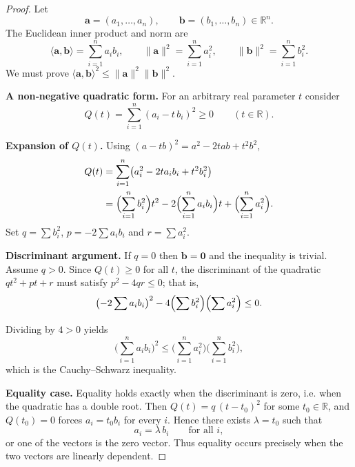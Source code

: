 \begin{proof}
Let 
\[
\mathbf a=(a_{1},\dots ,a_{n}),\qquad 
\mathbf b=(b_{1},\dots ,b_{n})\in\mathbb R^{n}.
\]
The Euclidean inner product and norm are  
\[
\langle\mathbf a,\mathbf b\rangle =\sum_{i=1}^{n}a_{i}b_{i},\qquad 
\|\mathbf a\|^{2}= \sum_{i=1}^{n}a_{i}^{2},\qquad 
\|\mathbf b\|^{2}= \sum_{i=1}^{n}b_{i}^{2}.
\]
We must prove \(\langle\mathbf a,\mathbf b\rangle^{2}\le\|\mathbf a\|^{2}\|\mathbf b\|^{2}\).

\medskip
\textbf{A non‑negative quadratic form.}  
For an arbitrary real parameter \(t\) consider  
\[
Q(t)=\sum_{i=1}^{n}(a_{i}-t\,b_{i})^{2}\ge 0\qquad(t\in\mathbb R).
\]

\medskip
\textbf{Expansion of \(Q(t)\).}  
Using \((a-tb)^{2}=a^{2}-2t a b+t^{2}b^{2}\),
\begin{align*}
Q(t)&=\sum_{i=1}^{n}\bigl(a_{i}^{2}-2t a_{i}b_{i}+t^{2}b_{i}^{2}\bigr)\\
    &=\Bigl(\sum_{i=1}^{n}b_{i}^{2}\Bigr)t^{2}
      -2\Bigl(\sum_{i=1}^{n}a_{i}b_{i}\Bigr)t
      +\Bigl(\sum_{i=1}^{n}a_{i}^{2}\Bigr).
\end{align*}
Set \(q=\sum b_{i}^{2}\), \(p=-2\sum a_{i}b_{i}\) and \(r=\sum a_{i}^{2}\).

\medskip
\textbf{Discriminant argument.}  
If \(q=0\) then \(\mathbf b=\mathbf 0\) and the inequality is trivial.  
Assume \(q>0\). Since \(Q(t)\ge 0\) for all \(t\), the discriminant of the quadratic
\(qt^{2}+pt+r\) must satisfy \(p^{2}-4qr\le 0\); that is,
\[
\bigl(-2\sum a_{i}b_{i}\bigr)^{2}
-4\Bigl(\sum b_{i}^{2}\Bigr)\Bigl(\sum a_{i}^{2}\Bigr)\le 0 .
\]

Dividing by \(4>0\) yields
\[
\bigl(\sum_{i=1}^{n}a_{i}b_{i}\bigr)^{2}
\le
\bigl(\sum_{i=1}^{n}a_{i}^{2}\bigr)
\bigl(\sum_{i=1}^{n}b_{i}^{2}\bigr),
\]
which is the Cauchy–Schwarz inequality.

\medskip
\textbf{Equality case.}  
Equality holds exactly when the discriminant is zero, i.e. when the quadratic
has a double root. Then \(Q(t)=q\,(t-t_{0})^{2}\) for some \(t_{0}\in\mathbb R\), and
\(Q(t_{0})=0\) forces \(a_{i}=t_{0}b_{i}\) for every \(i\). Hence there exists
\(\lambda=t_{0}\) such that
\[
a_{i}= \lambda\,b_{i}\qquad\text{for all }i,
\]
or one of the vectors is the zero vector. Thus equality occurs precisely when the
two vectors are linearly dependent.

\end{proof}
